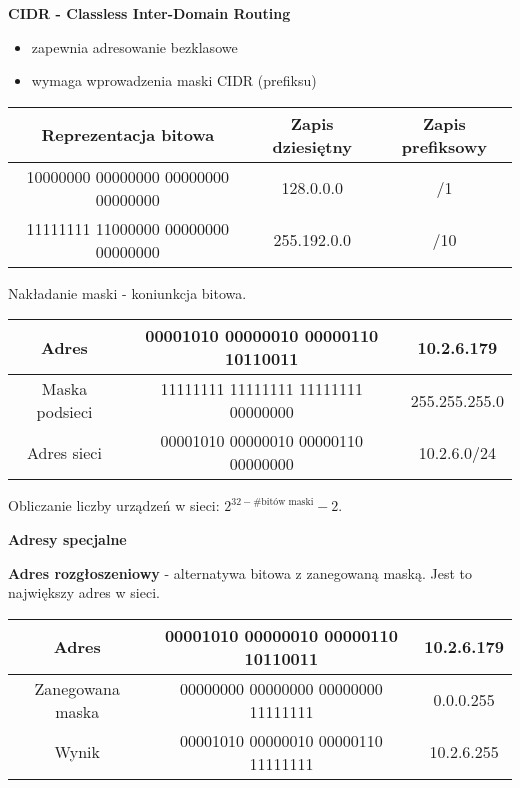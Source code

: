 \textbf{CIDR - Classless Inter-Domain Routing}
\begin{itemize}
    \item zapewnia adresowanie bezklasowe
    \item wymaga wprowadzenia maski CIDR (prefiksu) 
\end{itemize}

\begin{center}
    \centering
    \begin{tabular}{|c|c|c|}
         \hline
         Reprezentacja bitowa & Zapis dziesiętny & Zapis prefiksowy \\
         \hline
         10000000 00000000 00000000 00000000 & 128.0.0.0 & /1 \\
         11111111 11000000 00000000 00000000 & 255.192.0.0 & /10 \\
         \hline
    \end{tabular}
\end{center}

Nakładanie maski - koniunkcja bitowa.

\begin{center}
    \centering
    \begin{tabular}{|c|c|c|}
         \hline
         Adres & 00001010 00000010 00000110 10110011 & 10.2.6.179 \\
         \hline
         Maska podsieci & 11111111 11111111 11111111 00000000 & 255.255.255.0 \\
         \hline
         Adres sieci & 00001010 00000010 00000110 00000000 & 10.2.6.0/24 \\
         \hline
    \end{tabular}
\end{center}

Obliczanie liczby urządzeń w sieci: $2^{32 - \text{\# bitów maski}} - 2$.

\textbf{Adresy specjalne}

\textbf{Adres rozgłoszeniowy} - alternatywa bitowa z zanegowaną maską. Jest to największy adres w sieci. 
\begin{center}
    \centering
    \begin{tabular}{|c|c|c|}
         \hline
         Adres & 00001010 00000010 00000110 10110011 & 10.2.6.179 \\
         \hline
         Zanegowana maska & 00000000 00000000 00000000 11111111 & 0.0.0.255 \\
         \hline
         Wynik & 00001010 00000010 00000110 11111111 & 10.2.6.255 \\
         \hline
    \end{tabular}
\end{center}

